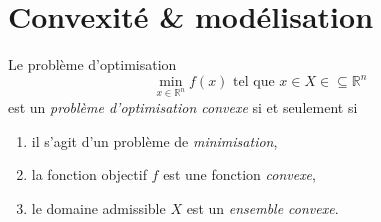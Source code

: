 \section{Convexité \& modélisation}

Le problème d'optimisation 
\[ 
\min_{x\in \mathbb{R}^n} f(x) \mbox{ tel que } x\in X\in\subseteq\mathbb{R}^n 
\]
est un \emph{problème d'optimisation convexe} si et seulement si
\begin{enumerate}
  \item il s'agit d'un problème de \emph{minimisation},
  \item la fonction objectif $f$ est une fonction \emph{convexe},
  \item le domaine admissible $X$ est un \emph{ensemble convexe}.
\end{enumerate}

\newpage

